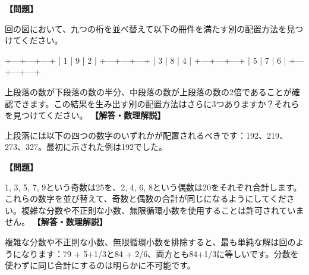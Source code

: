 \documentclass[10pt,a4paper,oneside,openany]{ltjsbook}
\begin{document}
\begin{tcolorbox}[colback=softblue,colframe=primaryblue,title=\textbf{第 77 問：DIGITS AND SQUARES.},arc=2mm,boxrule=1pt,breakable]
\textbf{【問題】}\par\vspace{0.3em}
回の図において、九つの桁を並べ替えて以下の冊件を満たす別の配置方法を見つけてください。

    +---+---+---+
    | 1 | 9 | 2 |
    +---+---+---+
    | 3 | 8 | 4 |
    +---+---+---+
    | 5 | 7 | 6 |
    +---+---+---+

上段落の数が下段落の数の半分、中段落の数が上段落の数の2倍であることが確認できます。この結果を生み出す別の配置方法はさらに3つありますか？それらを見つけてください。
\tcblower
\textbf{【解答・数理解説】}\par\vspace{0.3em}
上段落には以下の四つの数字のいずれかが配置されるべきです：192、219、273、327。最初に示された例は192でした。
\end{tcolorbox}

\begin{tcolorbox}[colback=softblue,colframe=primaryblue,title=\textbf{第 78 問：奇数と偶数の数字 （原題: ODD AND EVEN DIGITS.）},arc=2mm,boxrule=1pt,breakable]
\textbf{【問題】}\par\vspace{0.3em}
1, 3, 5, 7, 9という奇数は25を、2, 4, 6, 8という偶数は20をそれぞれ合計します。これらの数字を並び替えて、奇数と偶数の合計が同じになるようにしてください。複雑な分数や不正則な小数、無限循環小数を使用することは許可されていません。
\tcblower
\textbf{【解答・数理解説】}\par\vspace{0.3em}
複雑な分数や不正則な小数、無限循環小数を排除すると、最も単純な解は回のようになります：79 + 5+1/3と84 + 2/6、両方とも84+1/3に等しいです。分数を使わずに同じ合計にするのは明らかに不可能です。
\end{tcolorbox}
\end{document}
